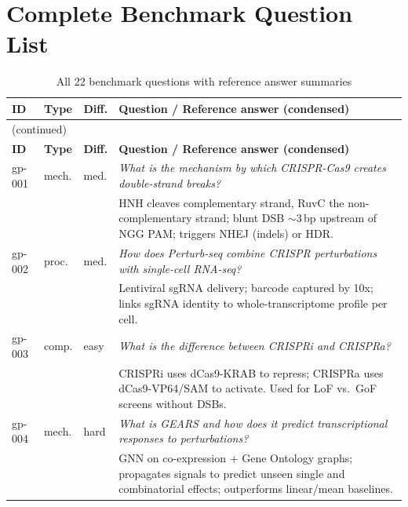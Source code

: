 \documentclass[12pt, a4paper]{article}
\begin{document}
\appendix

\section{Complete Benchmark Question List}
\label{app:questions}

\begin{longtable}{@{}llp{1.0cm}p{8.8cm}@{}}
\caption{All 22 benchmark questions with reference answer summaries} \\
\toprule
\textbf{ID} & \textbf{Type} & \textbf{Diff.} & \textbf{Question / Reference answer (condensed)} \\
\midrule
\endfirsthead
\multicolumn{4}{l}{\small(continued)}\\
\toprule
\textbf{ID} & \textbf{Type} & \textbf{Diff.} & \textbf{Question / Reference answer (condensed)} \\
\midrule
\endhead
\bottomrule
\endfoot

gp-001 & mech. & med. &
  \textit{What is the mechanism by which CRISPR-Cas9 creates double-strand breaks?}\\
& & & \scriptsize HNH cleaves complementary strand, RuvC the non-complementary strand; blunt DSB $\sim$3\,bp upstream of NGG PAM; triggers NHEJ (indels) or HDR. \\[2pt]

gp-002 & proc. & med. &
  \textit{How does Perturb-seq combine CRISPR perturbations with single-cell RNA-seq?}\\
& & & \scriptsize Lentiviral sgRNA delivery; barcode captured by 10x; links sgRNA identity to whole-transcriptome profile per cell. \\[2pt]

gp-003 & comp. & easy &
  \textit{What is the difference between CRISPRi and CRISPRa?}\\
& & & \scriptsize CRISPRi uses dCas9-KRAB to repress; CRISPRa uses dCas9-VP64/SAM to activate. Used for LoF vs.\ GoF screens without DSBs. \\[2pt]

gp-004 & mech. & hard &
  \textit{What is GEARS and how does it predict transcriptional responses to perturbations?}\\
& & & \scriptsize GNN on co-expression + Gene Ontology graphs; propagates signals to predict unseen single and combinatorial effects; outperforms linear/mean baselines. \\[2pt]


\end{longtable}
\end{document}
